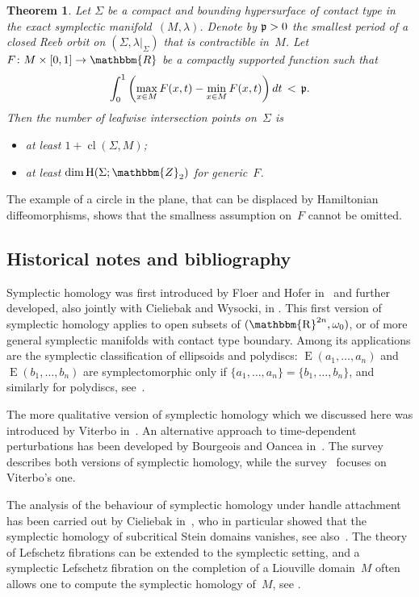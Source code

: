\documentclass[12pt,twoside]{amsart}
\def\cuplength{\operatorname{cl}}
\theoremstyle{plain}
\newtheorem{theorem}{Theorem}[section]
\numberwithin{figure}{section}
\numberwithin{equation}{section}
\def\s{\smallskip}
\def\H{\operatorname{H}}
\def\E{\operatorname{E}}
\def\RR{\mathbbm{R}}
\def\ZZ{\mathbbm{Z}}
\def\R{\operatorname{\mathbbm{R}}}
\begin{document}
\begin{theorem} \label{t:RF}
Let $\Sigma$ be a compact and bounding hypersurface of contact type
in the exact symplectic manifold~$(M,\lambda)$.
Denote by $\frak p >0$ the smallest period of a closed Reeb orbit on $(\Sigma, \lambda |_{\Sigma})$
that is contractible in~$M$.
Let $F \colon M \times [0,1] \to \RR$ be a compactly supported function such that
$$ 
\int_0^1 \left( \max_{x \in M} F(x,t) - \min_{x \in M} F(x,t) \right) dt
\,<\, \frak{p} .
$$
Then the number of leafwise intersection points on~$\Sigma$ is 
%
\begin{itemize}
\item[(i)]
at least $1 + \cuplength (\Sigma,M)$;

\s
\item[(ii)]
at least $\dim \H (\Sigma;\ZZ_2)$ for generic~$F$.
\end{itemize}
\end{theorem}

The example of a circle in the plane, that can be displaced by Hamiltonian diffeomorphisms,
shows that the smallness assumption on~$F$ cannot be omitted.



\subsection*{Historical notes and bibliography} 
Symplectic homology was first introduced by Floer and Hofer in~\cite{fh94} and further developed, also jointly with Cieliebak and Wysocki, in \cite{fhw94,cfh95,cfhw96}. 
This first version of symplectic homology applies to open subsets of $(\R^{2n},\omega_0)$, 
or of more general symplectic manifolds with contact type boundary. 
Among its applications are the symplectic classification of ellipsoids and polydiscs:
$\E (a_1, \dots, a_n)$ and $\E (b_1, \dots, b_n)$ are symplectomorphic only if 
$\{ a_1, \dots, a_n \} = \{ b_1, \dots, b_n \}$, and similarly for polydiscs,
see~\cite{fhw94}.

The more qualitative version of symplectic homology which we discussed here was introduced by Viterbo in~\cite{vit99}. 
An alternative approach to time-dependent perturbations has been developed by Bourgeois and Oancea in~\cite{bo09a}. 
The survey~\cite{oan04} describes both versions of symplectic homology, 
while the survey~\cite{sei08} focuses on Viterbo's one. 

The analysis of the behaviour of symplectic homology under handle attachment has been carried out by Cieliebak in~\cite{cie02}, 
who in particular showed that the symplectic homology of subcritical Stein domains vanishes, see also~\cite{bc01}. 
The theory of Lefschetz fibrations can be extended to the symplectic setting, and a symplectic Lefschetz fibration on the completion of a Liouville domain~$M$ 
often allows one to compute the symplectic homology of~$M$, see \cite{eli97,sei08,mcl12}.
\end{document}
